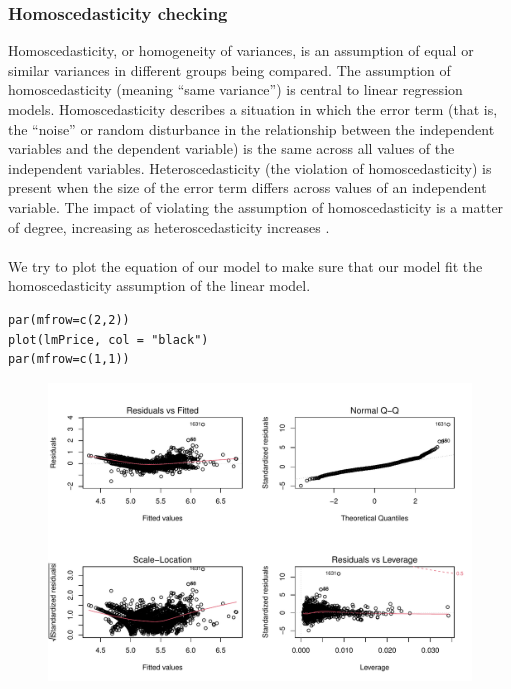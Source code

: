 \documentclass[a4paper]{article}
\begin{document}
\subsubsection{Homoscedasticity checking}
Homoscedasticity, or homogeneity of variances, is an assumption of equal or similar variances in different groups being compared. The assumption of homoscedasticity (meaning “same variance”) is central to linear regression models.  Homoscedasticity describes a situation in which the error term (that is, the “noise” or random disturbance in the relationship between the independent variables and the dependent variable) is the same across all values of the independent variables.  Heteroscedasticity (the violation of homoscedasticity) is present when the size of the error term differs across values of an independent variable.  The impact of violating the assumption of homoscedasticity is a matter of degree, increasing as heteroscedasticity increases \cite{bib14}.\\\\
We try to plot the equation of our model to make sure that our model fit the homoscedasticity assumption of the linear model.
\begin{mdframed}[leftline=false,rightline=false,backgroundcolor=lightblue!10,nobreak=false]
    \begin{verbatim}
par(mfrow=c(2,2))
plot(lmPrice, col = "black")
par(mfrow=c(1,1))
    \end{verbatim}
\end{mdframed}
\begin{figure}[H]
    \centering
    \includegraphics[keepaspectratio, width=1\textwidth, height=1\textheight]{LRM/Rplot2.pdf}
\end{figure}
\end{document}
